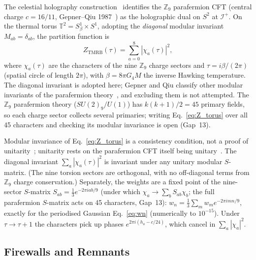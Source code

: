 \documentclass[11pt,a4paper]{article}
\begin{document}
The celestial holography construction~\cite{BresslerCH2026} identifies the
$\mathbb{Z}_9$ parafermion CFT (central charge $c = 16/11$, Gepner--Qiu
1987~\cite{GepnerQiu1987}) as the holographic dual on $S^2$ at $\mathscr{I}^+$.
On the thermal torus $\mathbb{T}^2 = S^1_\beta \times S^1$, adopting the
\emph{diagonal} modular invariant $M_{ab} = \delta_{ab}$, the partition function
is
\begin{equation}
  Z_{\mathrm{TMRB}}(\tau) = \sum_{a=0}^{8}|\chi_a(\tau)|^2,
  \label{eq:Z_torus}
\end{equation}
where $\chi_a(\tau)$ are the characters of the nine $\mathbb{Z}_9$ charge sectors and
$\tau = i\beta/(2\pi)$ (spatial circle of length $2\pi$), with $\beta = 8\pi G_4 M$ the inverse Hawking temperature.
The diagonal invariant is adopted here; Gepner and Qiu classify other
modular invariants of the parafermion theory~\cite{GepnerQiu1987}, and excluding
them is not attempted.
The $\mathbb{Z}_9$ parafermion theory ($SU(2)_9/U(1)$) has $k(k+1)/2 = 45$
primary fields, so each charge sector collects several primaries; writing
Eq.~\eqref{eq:Z_torus} over all 45 characters and checking its modular
invariance is open (Gap~13).

Modular invariance of Eq.~\eqref{eq:Z_torus} is a consistency condition, not a
proof of unitarity~\cite{DiFrancesco1997}; unitarity rests on the parafermion CFT
itself being unitary~\cite{GepnerQiu1987}. The diagonal invariant
$\sum_a|\chi_a(\tau)|^2$ is invariant under any unitary modular $S$-matrix.
(The nine torsion sectors are orthogonal, with no off-diagonal terms from $\mathbb{Z}_9$
charge conservation.)  Separately, the weights are a fixed point of the nine-sector $S$-matrix $S_{ab} = \frac{1}{3}e^{-2\pi iab/9}$
(under which $\chi_a\to\sum_b S_{ab}\chi_b$; the full parafermion
$S$-matrix acts on 45 characters, Gap~13):
$w_n = \frac{1}{3}\sum_m w_m e^{-2\pi i mn/9}$, exactly for the
periodised Gaussian Eq.~\eqref{eq:wn} (numerically to $10^{-15}$).
Under $\tau\to\tau+1$ the characters pick up phases $e^{2\pi i(h_a-c/24)}$, which cancel in $\sum_a|\chi_a|^2$.

\subsection{Firewalls and Remnants}
\end{document}
